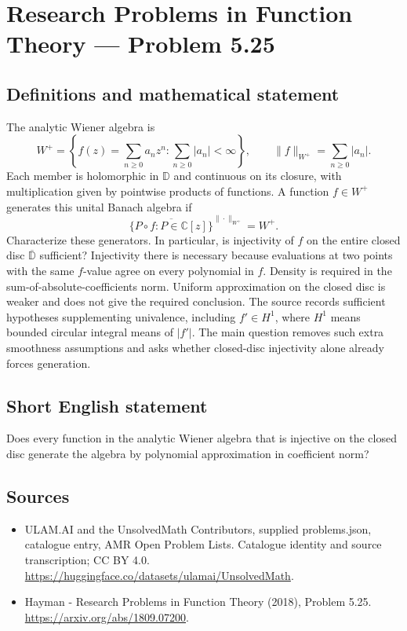\documentclass[11pt,a4paper]{article}
\begin{document}
\section*{Research Problems in Function Theory — Problem 5.25}\label{statement}

\subsection{Definitions and mathematical statement}
The analytic Wiener algebra is
\[
W^+=\left\{f(z)=\sum_{n\ge0}a_nz^n:\sum_{n\ge0}|a_n|<\infty\right\},
\qquad\|f\|_{W^+}=\sum_{n\ge0}|a_n|.
\]
Each member is holomorphic in $\mathbb D$ and continuous on its closure, with multiplication given by pointwise products of functions. A function $f\in W^+$ generates this unital Banach algebra if
\[
\overline{\{P\circ f:P\in\mathbb C[z]\}}^{\|\cdot\|_{W^+}}=W^+.
\]
Characterize these generators. In particular, is injectivity of $f$ on the entire closed disc $\overline{\mathbb D}$ sufficient? Injectivity there is necessary because evaluations at two points with the same $f$-value agree on every polynomial in $f$.
Density is required in the sum-of-absolute-coefficients norm. Uniform approximation on the closed disc is weaker and does not give the required conclusion. The source records sufficient hypotheses supplementing univalence, including $f'\in H^1$, where $H^1$ means bounded circular integral means of $|f'|$. The main question removes such extra smoothness assumptions and asks whether closed-disc injectivity alone already forces generation.
\subsection{Short English statement}
Does every function in the analytic Wiener algebra that is injective on the closed disc generate the algebra by polynomial approximation in coefficient norm?
\subsection{Sources}
\begin{itemize}
\item[S1] ULAM.AI and the UnsolvedMath Contributors, supplied problems.json, catalogue entry, AMR Open Problem Lists. Catalogue identity and source transcription; CC BY 4.0.
\url{https://huggingface.co/datasets/ulamai/UnsolvedMath}.
\item[S2] Hayman - Research Problems in Function Theory (2018), Problem 5.25. 
\url{https://arxiv.org/abs/1809.07200}.
\end{itemize}
\end{document}
